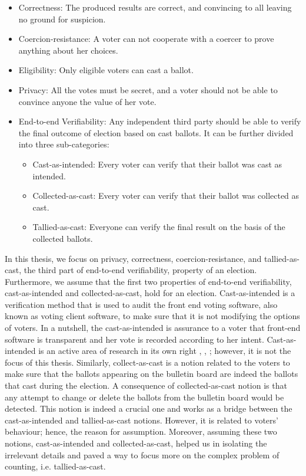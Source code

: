  \begin{itemize}
 
  \item Correctness:
 	The produced results are correct, and convincing to all leaving no  ground for suspicion. 

 \item Coercion-resistance: A voter can not cooperate with a coercer to prove anything about her choices.
 
 \item Eligibility: Only eligible voters can cast a ballot.
 	
 \item Privacy:
    All the votes must be secret, and a voter should not be able to convince anyone the 
    value of her vote.
 
 \item End-to-end Verifiability:
 Any independent third party should be able to verify the final outcome of election based on cast 
 ballots.  It can be further divided into three sub-categories:
 
 \begin{itemize}
  \item Cast-as-intended: Every voter can verify that their ballot was cast as
  intended.
  \item Collected-as-cast: Every voter can verify that their ballot was collected as
  cast.
  \item Tallied-as-cast: Everyone can verify the final result on the basis of the
  collected ballots.
\end{itemize}
\end{itemize}
	

In this thesis, we focus on privacy, correctness, coercion-resistance, and tallied-as-cast, the third part of end-to-end verifiability, property 
of an election. Furthermore, we assume that the first two properties of end-to-end verifiability, cast-as-intended and 
collected-as-cast, hold for an election. Cast-as-intended is a verification method that is used to audit the 
front end voting software, 
also known as voting client software, to make sure that it is not modifying the options of voters. In a nutshell, 
the cast-as-intended is assurance to a voter that front-end software is transparent and her vote 
is recorded according to her intent.  Cast-as-intended is an active area of research in its own right \citep{10.1007/978-3-319-22270-7_1},  \citep{mci/Marky2018},  \citep{cortier:hal-02346420}; 
however, it is not the focus of this thesis. Similarly,  collect-as-cast is a notion related to the voters to make 
sure that the ballots appearing on the bulletin board are indeed the ballots that cast during the election. A consequence 
of collected-as-cast notion is that any attempt to change or delete the ballots from the bulletin board would 
be detected. This notion is indeed a crucial one and works as a bridge between the cast-as-intended and tallied-as-cast 
notions. However, it is related to voters' behaviour; hence, the reason for assumption.  Moreover, assuming these two 
notions, cast-as-intended and collected-as-cast, helped us in isolating the irrelevant details and 
paved a way to focus more on the complex problem of counting, i.e. tallied-as-cast. 


